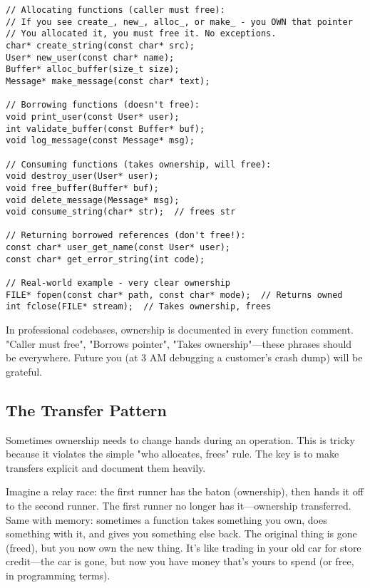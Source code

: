 \begin{lstlisting}
// Allocating functions (caller must free):
// If you see create_, new_, alloc_, or make_ - you OWN that pointer
// You allocated it, you must free it. No exceptions.
char* create_string(const char* src);
User* new_user(const char* name);
Buffer* alloc_buffer(size_t size);
Message* make_message(const char* text);

// Borrowing functions (doesn't free):
void print_user(const User* user);
int validate_buffer(const Buffer* buf);
void log_message(const Message* msg);

// Consuming functions (takes ownership, will free):
void destroy_user(User* user);
void free_buffer(Buffer* buf);
void delete_message(Message* msg);
void consume_string(char* str);  // frees str

// Returning borrowed references (don't free!):
const char* user_get_name(const User* user);
const char* get_error_string(int code);

// Real-world example - very clear ownership
FILE* fopen(const char* path, const char* mode);  // Returns owned
int fclose(FILE* stream);  // Takes ownership, frees
\end{lstlisting}

\begin{tipbox}
In professional codebases, ownership is documented in every function comment. "Caller must free", "Borrows pointer", "Takes ownership"—these phrases should be everywhere. Future you (at 3 AM debugging a customer's crash dump) will be grateful.
\end{tipbox}

\subsection{The Transfer Pattern}

Sometimes ownership needs to change hands during an operation. This is tricky because it violates the simple "who allocates, frees" rule. The key is to make transfers explicit and document them heavily.

Imagine a relay race: the first runner has the baton (ownership), then hands it off to the second runner. The first runner no longer has it—ownership transferred. Same with memory: sometimes a function takes something you own, does something with it, and gives you something else back. The original thing is gone (freed), but you now own the new thing. It's like trading in your old car for store credit—the car is gone, but now you have money that's yours to spend (or free, in programming terms).

